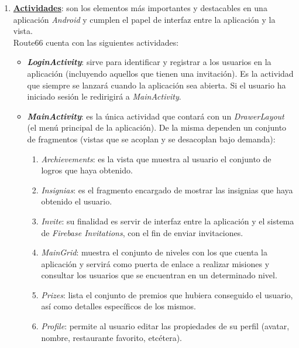 \documentclass[twoside]{report}
\begin{document}
\begin{enumerate}
\item \textbf{\underline{Actividades}}: son los elementos más importantes y destacables en una aplicación \textit{Android} y cumplen el papel de interfaz entre la aplicación y la vista.\\
Route66 cuenta con las siguientes actividades:

	\begin{itemize}
	\item \textbf{\textit{LoginActivity}}: sirve para identificar y registrar a los usuarios en la aplicación (incluyendo aquellos que tienen una invitación). Es la actividad que siempre se lanzará cuando la aplicación sea abierta. Si el usuario ha iniciado sesión le redirigirá  a \textit{MainActivity}.
	
	\item \textbf{\textit{MainActivity}}: es la única actividad que contará con un \textit{DrawerLayout} (el menú principal de la aplicación). De la misma dependen un conjunto de fragmentos (vistas que se acoplan y se desacoplan bajo demanda):
	
		\begin{enumerate}
			\item \textit{Archievements}: es la vista que muestra al usuario el conjunto de logros que haya obtenido.
			
			\item \textit{Insignias}: es el fragmento encargado de mostrar las insignias que haya obtenido el usuario.
			
			\item \textit{Invite}: su finalidad es servir de interfaz entre la aplicación y el sistema de \textit{Firebase Invitations}, con el fin de enviar invitaciones.
			
			\item \textit{MainGrid}: muestra el conjunto de niveles con los que cuenta la aplicación y servirá como puerta de enlace a realizar misiones y consultar los usuarios que se encuentran en un determinado nivel.
			
			\item \textit{Prizes}: lista el conjunto de premios que hubiera conseguido el usuario, así como detalles específicos de los mismos.
			
			\item \textit{Profile}: permite al usuario editar las propiedades de su perfil (avatar, nombre, restaurante favorito, etcétera).
			

\end{enumerate}
\end{itemize}
\end{enumerate}
\end{document}
